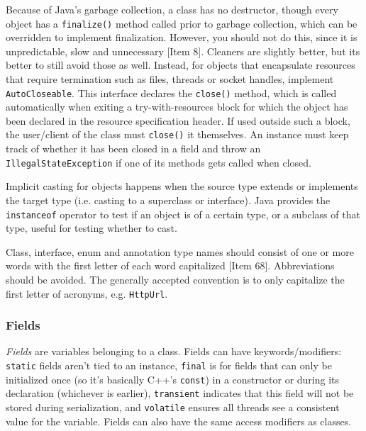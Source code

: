 \documentclass[table, xcdraw]{article}%
\begin{document}
Because of Java's garbage collection, a class has no destructor, though every object has a \texttt{finalize()} method called prior to garbage collection, which can be overridden to implement finalization. However, you should not do this, since it is unpredictable, slow and unnecessary [Item 8]. Cleaners are slightly better, but its better to still avoid those as well. Instead, for objects that encapsulate resources that require termination such as files, threads or socket handles, implement \texttt{AutoCloseable}. This interface declares the \texttt{close()} method, which is called automatically when exiting a try-with-resources block for which the object has been declared in the resource specification header. If used outside such a block, the user/client of the class must \texttt{close()} it themselves. An instance must keep track of whether it has been closed in a field and throw an \texttt{IllegalStateException} if one of its methods gets called when closed.

Implicit casting for objects happens when the source type extends or implements the target type (i.e. casting to a superclass or interface). Java provides the \texttt{instanceof} operator to test if an object is of a certain type, or a subclass of that type, useful for testing whether to cast.

Class, interface, enum and annotation type names should consist of one or more words with the first letter of each word capitalized [Item 68]. Abbreviations should be avoided. The generally accepted convention is to only capitalize the first letter of acronyms, e.g. \texttt{HttpUrl}.

\subsubsection{Fields}

\emph{Fields} are variables belonging to a class. Fields can have keywords/modifiers: \texttt{static} fields aren't tied to an instance, \texttt{final} is for fields that can only be initialized once (so it's basically C++'s \texttt{const}) in a constructor or during its declaration (whichever is earlier), \texttt{transient} indicates that this field will not be stored during serialization, and \texttt{volatile} ensures all threads see a consistent value for the variable. Fields can also have the same access modifiers as classes.
\end{document}
